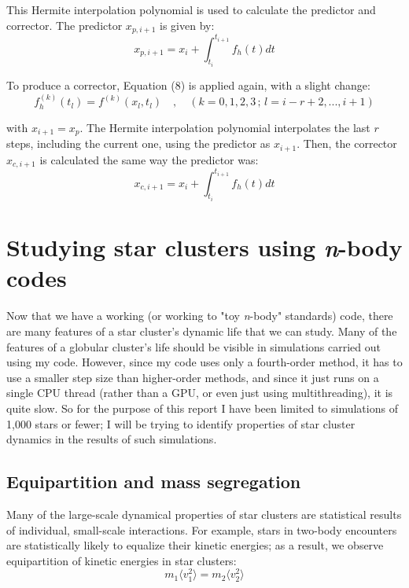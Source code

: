 \documentclass{article}
\begin{document}
This Hermite interpolation polynomial is used to calculate the predictor and corrector. The predictor $x_{p,i+1}$ is given by:
\begin{equation}
x_{p,i+1} = x_i + \int_{t_i}^{t_{i+1}} f_h(t)dt
\end{equation}

To produce a corrector, Equation (8) is applied again, with a slight change:
\begin{equation}
f^{(k)}_h(t_l) = f^{(k)}(x_l,t_l) \quad,\quad (k=0,1,2,3\,;\,l=i-r+2,...,i+1)
\end{equation}

with $x_{i+1} = x_p$. The Hermite interpolation polynomial interpolates the last $r$ steps, including the current one, using the predictor as $x_{i+1}$. Then, the corrector $x_{c,i+1}$ is calculated the same way the predictor was:
\begin{equation}
x_{c,i+1} = x_i + \int_{t_i}^{t_{i+1}} f_h(t)dt
\end{equation}

\section{Studying star clusters using \textit{n}-body codes}

Now that we have a working (or working to "toy \textit{n}-body" standards) code,  there are many features of a star cluster's dynamic life that we can study. Many of the features of a globular cluster's life should be visible in simulations carried out using my code. However, since my code uses only a fourth-order method, it has to use a smaller step size than higher-order methods, and since it just runs on a single CPU thread (rather than a GPU, or even just using multithreading), it is quite slow. So for the purpose of this report I have been limited to simulations of 1,000 stars or fewer; I will be trying to identify properties of star cluster dynamics in the results of such simulations.

\subsection{Equipartition and mass segregation}

Many of the large-scale dynamical properties of star clusters are statistical results of individual, small-scale interactions. For example, stars in two-body encounters are statistically likely to equalize their kinetic energies; as a result, we observe equipartition of kinetic energies in star clusters:
\begin{equation}
\label{equipartition}
m_1\langle v_1^2\rangle = m_2\langle v_2^2\rangle
\end{equation}
\end{document}

